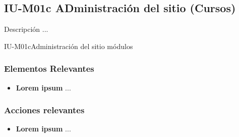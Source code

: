 
\subsection{IU-M01c ADministración del sitio (Cursos)}

 Descripción ...

        {IU-M01c}{Administración del sitio módulos}

\subsubsection{Elementos Relevantes}

    \begin{itemize}
    \item {\bf Lorem ipsum}
        ...
    \end{itemize}

\subsubsection{Acciones relevantes}

    \begin{itemize}
    \item {\bf Lorem ipsum}
        ...
    \end{itemize}

\clearpage
